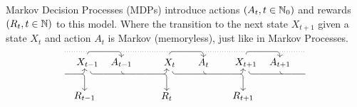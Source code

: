 Markov Decision Processes (MDPs) introduce actions \((A_t,t\in\mathbb{N}_0)\) and rewards \((R_t,t\in\mathbb{N})\) to this model. Where the transition to the next state \(X_{t+1}\) given a state \(X_{t}\) and action \(A_{t}\) is Markov (memoryless), just like in Markov Processes.
\[
\begin{tikzpicture}
    \draw[dotted] (-3.7,0.4) -- (-2.8,0.4);

    \draw[->] (-3.7, -0.4) %
    to [out=0,in=180] (-3.1, -0.4)
    to [out=0,in=270] (-3, -0.2);

    \draw[->] (-3.1, -0.4) %
    to [out=0,in=90] (-3,-0.5)
    to [out=270, in=90] (-3,-1);

    \draw (-3,-1.2) node {\(R_{t-1}\)};
    \draw (-2.9,0) node {\(X_{t-1}\)};

    \draw[->] (-2.9,0.3) %
    to [out=90,in=180] (-2.8, 0.4) 
    to [out=0,in=180] (-1.8,0.4)
    to [out=0,in=90] (-1.7,0.2);

    \draw[dotted] (-1.7,0.4) -- (0.1,0.4);

    \draw (-1.7,0) node {\(A_{t-1}\)};

    \draw (-1.7, -0.3) %
    to [out=270,in=180] (-1.6,-0.4);

    \draw[->] (-2.8, -0.3) %
    to [out=270,in=180] (-2.7, -0.4) 
    to [out=0,in=180] (-0.2, -0.4)
    to [out=0,in=270] (-0.1, -0.2);

    \draw[->] (-0.2, -0.4) %
    to [out=0,in=90] (-0.1,-0.5)
    to [out=270, in=90] (-0.1,-1);

    \draw (-0.1,-1.2) node {\(R_t\)};
    \draw (0,0) node {\(X_t\)};
    
    \draw[->] (0,0.3)  %
    to [out=90,in=180] (0.1, 0.4) 
    to [out=0,in=180] (1.1,0.4)
    to [out=0,in=90] (1.2,0.2); 

    \draw[dotted] (1.2,0.4) -- (2.8,0.4);
 
    \draw (1.2,0) node {\(A_t\)};

    \draw (1.2, -0.3) %
    to [out=270,in=180] (1.3,-0.4);

    \draw[->] (0.1, -0.3) %
    to [out=270,in=180] (0.2, -0.4) 
    to [out=0,in=180] (2.5, -0.4)
    to [out=0,in=270] (2.6, -0.2);

    \draw[->] (2.5, -0.4) %
    to [out=0,in=90] (2.6,-0.5)
    to [out=270, in=90] (2.6,-1);

    \draw (2.6,-1.2) node {\(R_{t+1}\)};
    \draw (2.7,0) node {\(X_{t+1}\)};

    \draw[->] (2.7,0.3)  %
    to [out=90,in=180] (2.8, 0.4) 
    to [out=0,in=180] (3.8,0.4)
    to [out=0,in=90] (3.9,0.2); 

    \draw[dotted] (3.9,0.4) -- (4.8,0.4);

    \draw (3.9,0) node {\(A_{t+1}\)};

    \draw (3.9, -0.3) %
    to [out=270,in=180] (4,-0.4);

    \draw (2.8, -0.3) %
    to [out=270,in=180] (2.9, -0.4) 
    to [out=0,in=180] (4.8, -0.4);
\end{tikzpicture}
\]
